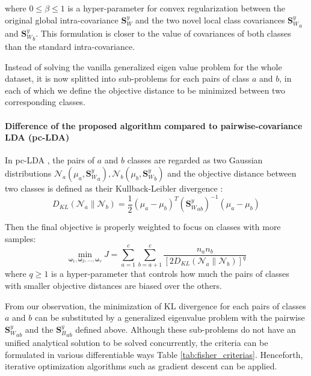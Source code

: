     where $0\le\beta\le1$ is a hyper-parameter for convex regularization between the original global intra-covariance ${\boldsymbol{S}_W^y}$ and the two novel local class covariances ${\boldsymbol{S}_W^y}_a$ and ${\boldsymbol{S}_W^y}_b$.
    This formulation is closer to the value of covariances of both classes than the standard intra-covariance.

    Instead of solving the vanilla generalized eigen value problem for the whole dataset, it is now splitted into sub-problems for each pairs of class $a$ and $b$, in each of which we define the objective distance to be minimized between two corresponding classes.

    \paragraph{Difference of the proposed algorithm compared to pairwise-covariance LDA (pc-LDA)}
        In pc-LDA \cite{kong2014pairwise}, the pairs of $a$ and $b$ classes are regarded as two Gaussian distributions $\mathcal{N}_a(\mu_a,{\boldsymbol{S}_W^y}_a), \mathcal{N}_b(\mu_b,{\boldsymbol{S}_W^y}_b)$ and the objective distance between two classes is defined as their Kullback-Leibler divergence \cite{kullback1951}:
        \begin{equation}
            D_{KL}\left(\mathcal{N}_a\parallel\mathcal{N}_b\right)=\frac{1}{2}\left(\mu_a-\mu_b\right)^{T}{\left({\boldsymbol{S}_W^y}_{ab}\right)}^{-1}\left(\mu_a-\mu_b\right)
        \end{equation}

        Then the final objective is properly weighted to focus on classes with more samples:
        \begin{equation}
            \operatorname*{min}_{\boldsymbol{\omega}_1, \boldsymbol{\omega}_2,...,
            \boldsymbol{\omega}_v}{J}=\sum_{a=1}^{c}\sum_{b=a+1}^{c}{\frac{n_an_b}{{[2D_{KL}\left(\mathcal{N}_a\parallel\mathcal{N}_b\right)]}^q}}
            \label{eq:pc-LDA}
        \end{equation}
        where $q\ge1$ is a hyper-parameter that controls how much the pairs of classes with smaller objective distances are biased over the others.

        From our observation, the minimization of KL divergence for each pairs of classes $a$ and $b$ can be substituted by a generalized eigenvalue problem with the pairwise ${\boldsymbol{S}_W^y}_{ab}$ and the ${\boldsymbol{S}_B^y}_{ab}$ defined above.
        Although these sub-problems do not have an unified analytical solution to be solved concurrently, the criteria can be formulated in various differentiable ways Table \ref{tab:fisher_criterias}.
        Henceforth, iterative optimization algorithms such as gradient descent can be applied.

